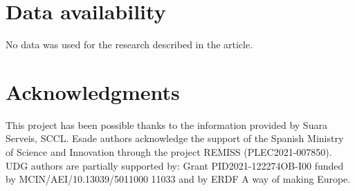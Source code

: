 \documentclass[10pt]{article}
\begin{document}
\section*{Data availability}
No data was used for the research described in the article.

\section*{Acknowledgments}
This project has been possible thanks to the information provided by Suara Serveis, SCCL. Esade authors acknowledge the support of the Spanish Ministry of Science and Innovation through the project REMISS (PLEC2021-007850). UDG authors are partially supported by: Grant PID2021-122274OB-I00 funded by MCIN/AEI/10.13039/5011000 11033 and by ERDF A way of making Europe.
\end{document}

